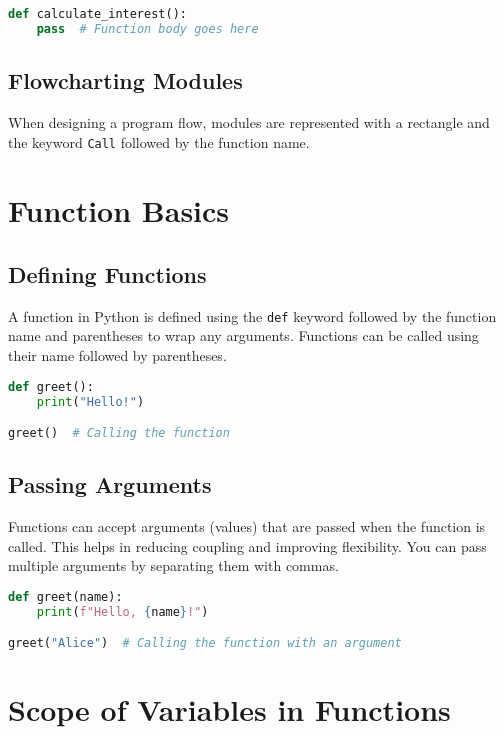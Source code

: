 \documentclass{article}
\begin{document}
\begin{lstlisting}[language=Python, caption={Example of Correct Function Naming}]
def calculate_interest():
    pass  # Function body goes here
\end{lstlisting}

\subsection{Flowcharting Modules}
When designing a program flow, modules are represented with a rectangle and the keyword \lstinline|Call| followed by the function name.

\section{Function Basics}

\subsection{Defining Functions}
A function in Python is defined using the \lstinline|def| keyword followed by the function name and parentheses to wrap any arguments. Functions can be called using their name followed by parentheses.

\begin{lstlisting}[language=Python, caption={Defining and Calling a Function}]
def greet():
    print("Hello!")

greet()  # Calling the function
\end{lstlisting}

\subsection{Passing Arguments}
Functions can accept arguments (values) that are passed when the function is called. This helps in reducing coupling and improving flexibility. You can pass multiple arguments by separating them with commas.

\begin{lstlisting}[language=Python, caption={Passing Arguments to a Function}]
def greet(name):
    print(f"Hello, {name}!")

greet("Alice")  # Calling the function with an argument
\end{lstlisting}

\section{Scope of Variables in Functions}
\end{document}

